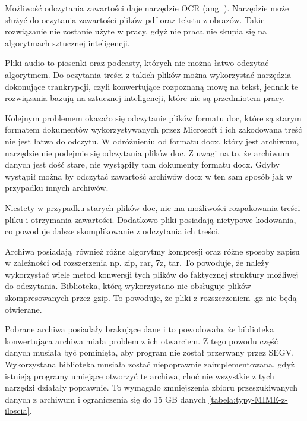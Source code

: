 Możliwość odczytania zawartości daje narzędzie OCR (ang. ).
Narzędzie może służyć do oczytania zawartości plików pdf oraz tekstu z obrazów.
Takie rozwiązanie nie zostanie użyte w pracy, gdyż nie praca nie skupia się na 
algorytmach sztucznej inteligencji.

Pliki audio to piosenki oraz podcasty, których nie można łatwo odczytać algorytmem.
Do oczytania treści z takich plików można wykorzystać narzędzia dokonujące 
trankrypcji, czyli konwertujące rozpoznaną mowę na tekst, jednak te rozwiązania bazują 
na sztucznej inteligencji, które nie są przedmiotem pracy.

Kolejnym problemem okazało się odczytanie plików formatu doc, które są starym 
formatem dokumentów wykorzystywanych przez Microsoft i ich zakodowana treść nie
jest łatwa do odczytu. W odróżnieniu od formatu docx, który jest archiwum, 
narzędzie nie podejmie się odczytania plików doc. Z uwagi na to, że archiwum danych
jest dość stare, nie wystąpiły tam dokumenty formatu docx. Gdyby wystąpił można
by odczytać zawartość archiwów docx w ten sam sposób jak w przypadku innych 
archiwów.

Niestety w przypadku starych plików doc, nie ma możliwości rozpakowania treści
pliku i otrzymania zawartości. Dodatkowo pliki posiadają nietypowe kodowania,
co powoduje dalsze skomplikowanie z odczytania ich treści.

Archiwa posiadają również różne algorytmy kompresji oraz różne sposoby zapisu w zależności od
rozszerzenia np. zip, rar, 7z, tar. To powoduje, że należy wykorzystać wiele
metod konwersji tych plików do faktycznej struktury możliwej do odczytania. 
Biblioteka, którą wykorzystano nie obsługuje plików skompresowanych przez gzip.
To powoduje, że pliki z rozszerzeniem .gz nie będą otwierane.

Pobrane archiwa posiadały brakujące dane i to powodowało, że biblioteka konwertująca
archiwa miała problem z ich otwarciem. Z tego powodu część danych musiała być 
pominięta, aby program nie został przerwany przez SEGV. Wykorzystana biblioteka
musiała zostać niepoprawnie zaimplementowana, gdyż istnieją programy umiejące 
otworzyć te archiwa, choć nie wszystkie z tych narzędzi działały poprawnie.
To wymagało zmniejszenia zbioru przeszukiwanych danych z archiwum i ograniczenia
się do 15 GB danych \ref{tabela:typy-MIME-z-iloscia}.

